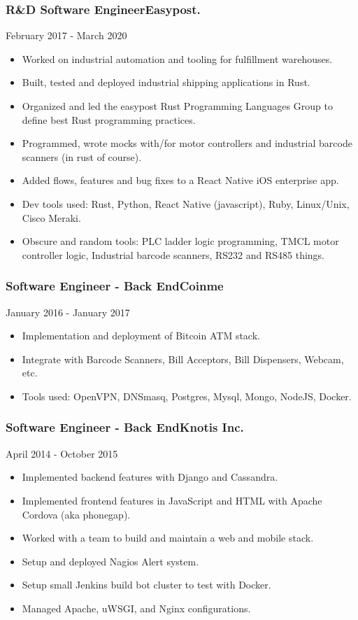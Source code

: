 \documentclass[9pt]{article}
\newenvironment{changemargin}[2]{%
  \begin{list}{}{%
    \setlength{\topsep}{0pt}%
    \setlength{\leftmargin}{#1}%
    \setlength{\rightmargin}{#2}%
    \setlength{\listparindent}{\parindent}%
    \setlength{\itemindent}{\parindent}%
    \setlength{\parsep}{\parskip}%
  }%
  \item[]}{\end{list}
}
\newenvironment{body} {
    \vspace*{-16pt}
    \begin{changemargin}{-0.20in}{-0.5in}
  }
    {\end{changemargin}
}
\newenvironment{jobdescriptionlist}[3]{
  \subsubsection*{#1\hfill\small#2}
  \small
  \vspace*{-5pt}
  {\hfill #3}
  \vspace*{-10pt}
  \begin{itemize}
   \setlength{\topsep}{0pt}
   \setlength{\itemsep}{1pt}
   \setlength{\parskip}{0pt}
   \setlength{\parsep}{0pt}
}{\end{itemize}\vspace*{-3pt}\normalsize}
\begin{document}
\begin{body}
    \vspace{18pt}

    \begin{jobdescriptionlist}{R\&D Software Engineer}{Easypost.}{February 2017 - March 2020}
        \item Worked on industrial automation and tooling for fulfillment warehouses.
        \item Built, tested and deployed industrial shipping applications in Rust.
        \item Organized and led the easypost Rust Programming Languages Group to define best Rust programming practices.
        \item Programmed, wrote mocks with/for motor controllers and industrial barcode scanners (in rust of course).
        \item Added flows, features and bug fixes to a React Native iOS enterprise app.
        \item Dev tools used: Rust, Python, React Native (javascript), Ruby, Linux/Unix, Cisco Meraki.
        \item Obscure and random tools: PLC ladder logic programming, TMCL motor controller logic, Industrial barcode scanners, RS232 and RS485 things.
    \end{jobdescriptionlist}

    \begin{jobdescriptionlist}{Software Engineer - Back End}{Coinme}{January 2016 - January 2017}
        \item Implementation and deployment of Bitcoin ATM stack.
        \item Integrate with Barcode Scanners, Bill Acceptors, Bill Dispensers, Webcam, etc.
        \item Tools used: OpenVPN, DNSmasq, Postgres, Mysql, Mongo, NodeJS, Docker.
    \end{jobdescriptionlist}

    \begin{jobdescriptionlist}{Software Engineer - Back End}{Knotis Inc.}{April 2014 - October 2015}
        \item Implemented backend features with Django and Cassandra.
        \item Implemented frontend features in JavaScript and HTML with Apache Cordova (aka phonegap).
        \item Worked with a team to build and maintain a web and mobile stack.
        \item Setup and deployed Nagios Alert system.
        \item Setup small Jenkins build bot cluster to test with Docker.
        \item Managed Apache, uWSGI, and Nginx configurations.
    \end{jobdescriptionlist}


\end{body}
\end{document}

